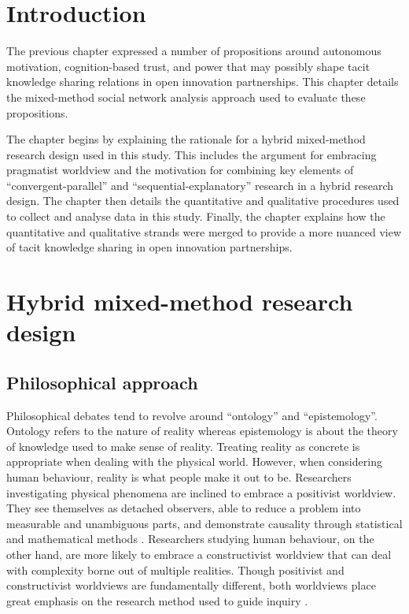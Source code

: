 
\section{Introduction}

The previous chapter expressed a number of propositions around autonomous motivation, cognition\hyp{}based trust, and power that may possibly shape tacit knowledge sharing relations in open innovation partnerships. This chapter details the mixed\hyp{}method social network analysis approach used to evaluate these propositions. \medskip

The chapter begins by explaining the rationale for a hybrid mixed\hyp{}method research design used in this study. This includes the argument for embracing pragmatist worldview and the motivation for combining key elements of  \enquote{convergent\hyp{}parallel} and \enquote{sequential\hyp{}explanatory} research in a hybrid research design. The chapter then details the quantitative and qualitative procedures used to collect and analyse data in this study. Finally, the chapter explains how the quantitative and qualitative strands were merged to provide a more nuanced view of tacit knowledge sharing in open innovation partnerships. \medskip

\section{Hybrid mixed\hyp{}method research design}

\subsection{Philosophical approach}

Philosophical debates tend to revolve around \enquote{ontology} and \enquote{epistemology}. Ontology refers to the nature of reality whereas epistemology is about the theory of knowledge used to make sense of reality. Treating reality as concrete is appropriate when dealing with the physical world. However, when considering human behaviour, reality is what people make it out to be. Researchers investigating physical phenomena are inclined to embrace a positivist worldview. They see themselves as detached observers, able to reduce a problem into measurable and unambiguous parts, and demonstrate causality through statistical and mathematical methods \citep{easterby2015management}. Researchers studying human behaviour, on the other hand, are more likely to embrace a constructivist worldview that can deal with complexity borne out of multiple realities. Though positivist and constructivist worldviews are fundamentally different, both worldviews place great emphasis on the research method used to guide inquiry \citep{easterby2015management}. \medskip


